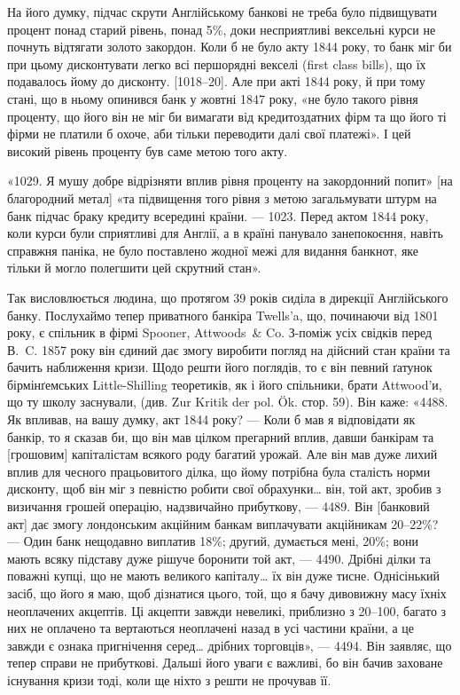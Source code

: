 На його думку, підчас скрути Англійському банкові не треба було підвищувати
процент понад старий рівень, понад 5\%, доки несприятливі вексельні
курси не почнуть відтягати золото закордон. Коли б не було акту 1844 року,
то банк міг би при цьому дисконтувати легко всі першорядні векселі (first class
bills), що їх подавалось йому до дисконту. [1018--20]. Але при акті 1844 року,
й при тому стані, що в ньому опинився банк у жовтні 1847 року, «не було
такого рівня проценту, що його він не міг би вимагати від кредитоздатних фірм
та що його ті фірми не платили б охоче, аби тільки переводити далі свої платежі».
І цей високий рівень проценту був саме метою того акту.

«1029. Я мушу добре відрізняти вплив рівня проценту на закордонний
попит» [на благородний метал] «та підвищення того рівня з метою загальмувати
штурм на банк підчас браку кредиту всередині країни. — 1023. Перед актом
1844 року, коли курси були сприятливі для Англії, а в країні панувало занепокоєння,
навіть справжня паніка, не було поставлено жодної межі для видання
банкнот, яке тільки й могло полегшити цей скрутний стан».

Так висловлюється людина, що протягом 39 років сиділа в дирекції Англійського
банку. Послухаймо тепер приватного банкіра Twells’a, що, починаючи
від 1801 року, є спільник в фірмі Spooner, Attwoods~\& Co. З-поміж усіх свідків
перед В.~C. 1857 року він єдиний дає змогу виробити погляд на дійсний стан
країни та бачить наближення кризи. Щодо решти його поглядів, то є він певний
ґатунок бірмінґемських Little-Shilling теоретиків, як і його спільники, брати
Attwood’и, що ту школу заснували, (див. Zur Kritik der pol. Ök. стор. 59). Він
каже: «4488. Як впливав, на вашу думку, акт 1844 року? — Коли б мав я
відповідати як банкір, то я сказав би, що він мав цілком прегарний вплив,
давши банкірам та [грошовим] капіталістам всякого роду багатий урожай. Але
він мав дуже лихий вплив для чесного працьовитого ділка, що йому потрібна
була сталість норми дисконту, щоб він міг з певністю робити свої обрахунки\dots{}
він, той акт, зробив з визичання грошей операцію, надзвичайно прибуткову, —
4489. Він [банковий акт] дає змогу лондонським акційним банкам виплачувати
акційникам 20--22\%? — Один банк нещодавно виплатив 18\%; другий, думається
мені, 20\%; вони мають всяку підставу дуже рішуче боронити той акт, — 4490. Дрібні ділки та поважні
купці, що не мають великого капіталу\dots{} їх він
дуже тисне. Однісінький засіб, що його я маю, щоб дізнатися цього, той, що я
бачу дивовижну масу їхніх неоплачених акцептів. Ці акцепти завжди невеликі,
приблизно з 20--100, багато з них не оплачено та вертаються неоплачені
назад в усі частини країни, а це завжди є ознака пригнічення серед\dots{}
дрібних торговців», — 4494. Він заявляє, що тепер справи не прибуткові. Дальші
його уваги є важливі, бо він бачив заховане існування кризи тоді, коли ще
ніхто з решти не прочував її.

